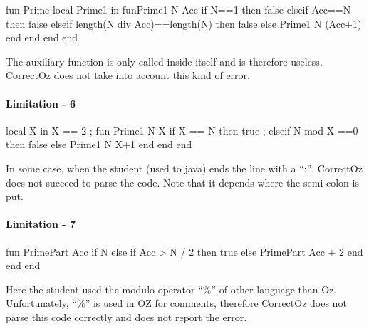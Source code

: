 \documentclass[11pt,a4paper,twoside,openright]{report}
\begin{document}
\begin{OZ}
fun {Prime}
	local Prime1 in 
	    fun{Prime1 N Acc}
    		    if N==1 then false
        		elseif Acc==N then false
	         elseif length(N div Acc)==length(N) then false
     	    else {Prime1 N (Acc+1)}
        		end
	    end
	end
end
\end{OZ}

The auxiliary function is only called inside itself and is therefore useless. 
CorrectOz does not take into account this kind of error.

%
%


\paragraph{Limitation - 6}
\begin{OZ}
local X in 
    X == 2 ;
    fun {Prime1 N X }
        if X == N then true ;
        elseif N mod X ==0 then false 
            else {Prime1 N X+1 }
        end 
    end
end

\end{OZ}

In some case, when the student (used to java) ends the line with a 
\enquote{;}, 
CorrectOz does not succeed to parse the code. Note that it depends 
where the semi colon is put.

\paragraph{Limitation - 7}

\begin{OZ}
fun {PrimePart Acc}
    if N %
    else if Acc > N / 2 then true
        else PrimePart Acc + 2
        end
    end
end		
\end{OZ}

Here the student used the modulo operator \enquote{\%} of other language than 
Oz. 
Unfortunately, \enquote{\%} is used in OZ for comments, therefore CorrectOz 
does not parse this code correctly and does not report the error.
\end{document}

